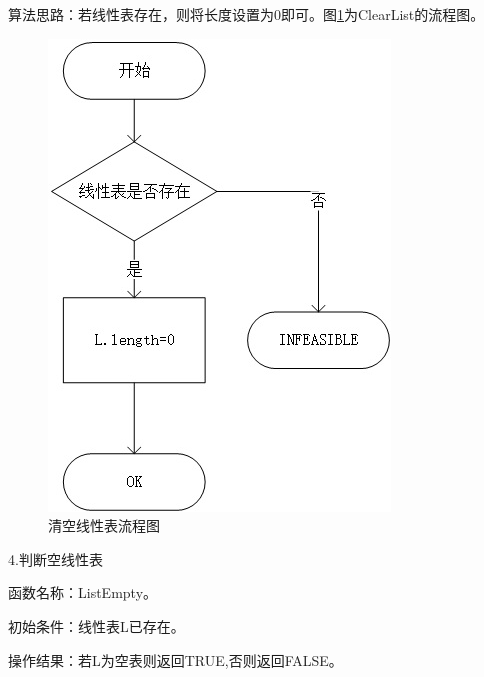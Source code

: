 \documentclass[supercite]{Experimental_Report}
\theoremstyle{definition}
\begin{document}
算法思路：若线性表存在，则将长度设置为0即可。图\ref{fig1-3}为ClearList的流程图。
\begin{figure}[htb] %
	\begin{center}
		\includegraphics[scale=0.9]{./images/顺序表/clear.jpg}
		\caption{清空线性表流程图}
		\label{fig1-3}
	\end{center}
\end{figure}

\newpage

4.判断空线性表

函数名称：ListEmpty。

初始条件：线性表L已存在。

操作结果：若L为空表则返回TRUE,否则返回FALSE。
\end{document}
